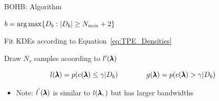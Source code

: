 \begin{frame}{BOHB: Algorithm}

\begin{center}
\begin{minipage}{0.75\textwidth}
\begin{algorithm}[H]
    \LinesNumbered
    \SetAlgoLined
    \setcounter{AlgoLine}{0}
    \DeclarePairedDelimiter\ceil{\lceil}{\rceil}
    \DeclarePairedDelimiter\floor{\lfloor}{\rfloor}
    \DeclarePairedDelimiter\abs{\lvert}{\rvert}
    
    $b=\operatorname*{arg\,max} \{D_b:\lvert D_b \rvert \geq N_{min}+2\}$
    
    
    Fit KDEs according to Equation~\ref{eq:TPE_Densities}
    
    Draw $N_s$ samples acoording to $l'(\pmb{\lambda})$
    
       
    \caption*{Pseudocode for sampling in BOHB}
\end{algorithm}
\end{minipage}
\end{center}

\pause
\begin{equation}
    l(\pmb{\lambda})=p(c({\pmb{\lambda}}) \le \gamma| D_b)\quad\quad\quad\quad
    g(\pmb{\lambda})=p(c({\pmb{\lambda}})>\gamma| D_b)
    \label{eq:TPE_Densities}
\end{equation}

\pause
\begin{itemize}
	\item Note: $l^{'}(\pmb{\lambda})$ is similar to $l(\pmb{\lambda},)$ but has larger bandwidths
\end{itemize}

\end{frame}
